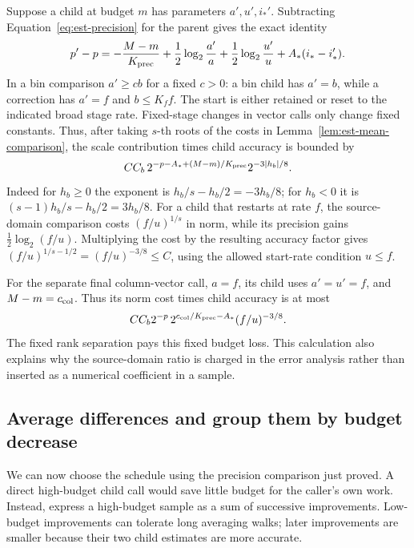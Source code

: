 Suppose a child at budget $m$ has parameters $a',u',i_*'$.  Subtracting
Equation~\eqref{eq:est-precision} for the parent gives the exact identity
\begin{equation}
 p'-p=-\frac{M-m}{K_{\rm prec}}
       +\frac12\log_2\frac{a'}a
       +\frac12\log_2\frac{u'}u
       +A_*(i_*-i_*').
 \label{eq:est-child-precision}
\end{equation}
In a bin comparison $a'\ge c b$ for a fixed $c>0$: a bin child has
$a'=b$, while a correction has $a'=f$ and $b\le K_f f$.
The start is either retained or reset to the indicated broad stage rate.
Fixed-stage changes in vector calls only change fixed constants.
Thus, after taking $s$-th roots of the costs in
Lemma~\ref{lem:est-mean-comparison}, the scale contribution times child
accuracy is bounded by
\begin{equation}
 C C_b\,2^{-p-A_*+(M-m)/K_{\rm prec}}
          2^{-3|h_b|/8}.
 \label{eq:est-scale-slack}
\end{equation}
Indeed for $h_b\ge0$ the exponent is $h_b/s-h_b/2=-3h_b/8$;
for $h_b<0$ it is $(s-1)h_b/s-h_b/2=3h_b/8$.
For a child that restarts at rate $f$, the source-domain comparison costs
$(f/u)^{1/s}$ in norm, while its precision gains
$\frac12\log_2(f/u)$.  Multiplying the cost by the resulting accuracy
factor gives
$(f/u)^{1/s-1/2}=(f/u)^{-3/8}\le C$, using the allowed start-rate
condition $u\le f$.

For the separate final column-vector call, $a=f$, its child uses
$a'=u'=f$, and $M-m=c_{\rm col}$.  Thus its norm cost times child
accuracy is at most
\[
 C C_b2^{-p}\,2^{c_{\rm col}/K_{\rm prec}-A_*}
       (f/u)^{-3/8}.
\]
The fixed rank separation pays this fixed budget loss.  This calculation
also explains why the source-domain ratio is charged in the error
analysis rather than inserted as a numerical coefficient in a sample.

\subsection{Average differences and group them by budget decrease}

We can now choose the schedule using the precision comparison just proved. A direct high-budget child call would save little budget for the caller's own work. Instead, express a high-budget sample as a sum of successive improvements. Low-budget improvements can tolerate long averaging walks; later improvements are smaller because their two child estimates are more accurate.

